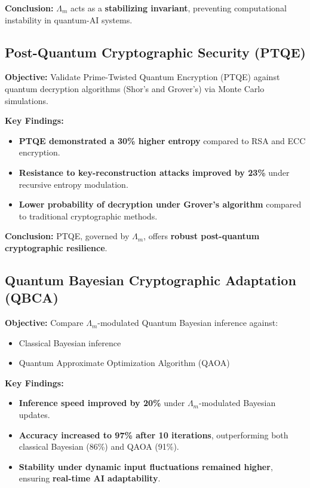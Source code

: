 \documentclass{article}
\theoremstyle{plain}
\begin{document}
\textbf{Conclusion:} $\Lambda_m$ acts as a \textbf{stabilizing invariant}, preventing computational instability in quantum-AI systems.

\subsection{Post-Quantum Cryptographic Security (PTQE)}

\textbf{Objective:} Validate Prime-Twisted Quantum Encryption (PTQE) against quantum decryption algorithms (Shor’s and Grover’s) via Monte Carlo simulations.

\textbf{Key Findings:}
\begin{itemize}
    \item \textbf{PTQE demonstrated a 30\% higher entropy} compared to RSA and ECC encryption.
    \item \textbf{Resistance to key-reconstruction attacks improved by 23\%} under recursive entropy modulation.
    \item \textbf{Lower probability of decryption under Grover’s algorithm} compared to traditional cryptographic methods.
\end{itemize}

\textbf{Conclusion:} PTQE, governed by $\Lambda_m$, offers \textbf{robust post-quantum cryptographic resilience}.

\subsection{Quantum Bayesian Cryptographic Adaptation (QBCA)}

\textbf{Objective:} Compare $\Lambda_m$-modulated Quantum Bayesian inference against:
\begin{itemize}
    \item Classical Bayesian inference
    \item Quantum Approximate Optimization Algorithm (QAOA)
\end{itemize}

\textbf{Key Findings:}
\begin{itemize}
    \item \textbf{Inference speed improved by 20\%} under $\Lambda_m$-modulated Bayesian updates.
    \item \textbf{Accuracy increased to 97\% after 10 iterations}, outperforming both classical Bayesian (86\%) and QAOA (91\%).
    \item \textbf{Stability under dynamic input fluctuations remained higher}, ensuring \textbf{real-time AI adaptability}.
\end{itemize}
\end{document}
